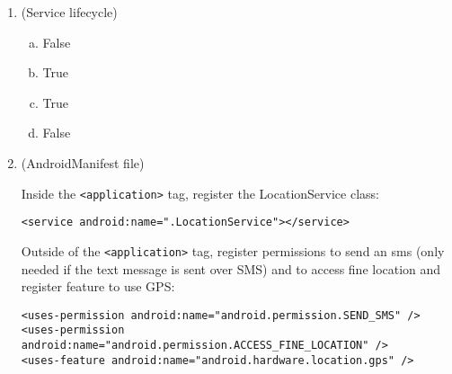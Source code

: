 \documentclass[11pt]{article}
\begin{document}
\begin{enumerate}
\item (Service lifecycle)

\begin{enumerate}[a)]
\item False
\item True
\item True
\item False

\end{enumerate}

\item (AndroidManifest file)

Inside the \lstinline{<application>} tag, register the LocationService class:
\begin{lstlisting}
<service android:name=".LocationService"></service>
\end{lstlisting}

Outside of the \lstinline{<application>} tag, register permissions to send an sms (only needed if the text message is sent over SMS) and to access fine location and register feature to use GPS:
\begin{lstlisting}
<uses-permission android:name="android.permission.SEND_SMS" />
<uses-permission android:name="android.permission.ACCESS_FINE_LOCATION" />
<uses-feature android:name="android.hardware.location.gps" />
\end{lstlisting}

\end{enumerate}
\end{document}
